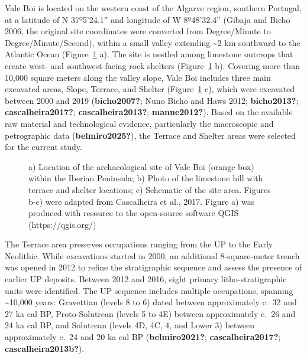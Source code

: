 \documentclass[
  a4paper,
  DIV=11,
  numbers=noendperiod]{scrreprt}
\begin{document}
Vale Boi is located on the western coast of the Algarve region, southern
Portugal, at a latitude of N 37º5'24.1'' and longitude of W 8º48'32.4''
(Gibaja and Bicho 2006, the original site coordinates were converted
from Degree/Minute to Degree/Minute/Second), within a small valley
extending \textasciitilde2 km southward to the Atlantic Ocean
(Figure~\ref{fig-map} a). The site is nestled among limestone outcrops
that create west- and southwest-facing rock shelters
(Figure~\ref{fig-map} b). Covering more than 10,000 square meters along
the valley slope, Vale Boi includes three main excavated areas, Slope,
Terrace, and Shelter (Figure~\ref{fig-map} c), which were excavated
between 2000 and 2019 (\textbf{bicho2007?}; Nuno Bicho and Haws 2012;
\textbf{bicho2013?}; \textbf{cascalheira2017?};
\textbf{cascalheira2013?}; \textbf{manne2012?}). Based on the available
raw material and technological evidence, particularly the macroscopic
and petrographic data (\textbf{belmiro2025?}), the Terrace and Shelter
areas were selected for the current study.

\begin{figure}


\caption{\label{fig-map}a) Location of the archaeological site of Vale
Boi (orange box) within the Iberian Peninsula; b) Photo of the limestone
hill with terrace and shelter locations; c) Schematic of the site area.
Figures b-c) were adapted from Cascalheira et al., 2017. Figure a) was
produced with resource to the open-source software QGIS
(https://qgis.org/)}

\end{figure}%

The Terrace area preserves occupations ranging from the UP to the Early
Neolithic. While excavations started in 2000, an additional
8-square-meter trench was opened in 2012 to refine the stratigraphic
sequence and assess the presence of earlier UP deposits. Between 2012
and 2016, eight primary litho-stratigraphic units were identified. The
UP sequence includes multiple occupations, spanning
\textasciitilde10,000 years: Gravettian (levels 8 to 6) dated between
approximately c.~32 and 27 ka cal BP, Proto-Solutrean (levels 5 to 4E)
between approximately c.~26 and 24 ka cal BP, and Solutrean (levels 4D,
4C, 4, and Lower 3) between approximately c.~24 and 20 ka cal BP
(\textbf{belmiro2021?}; \textbf{cascalheira2017?};
\textbf{cascalheira2013b?}).
\end{document}
